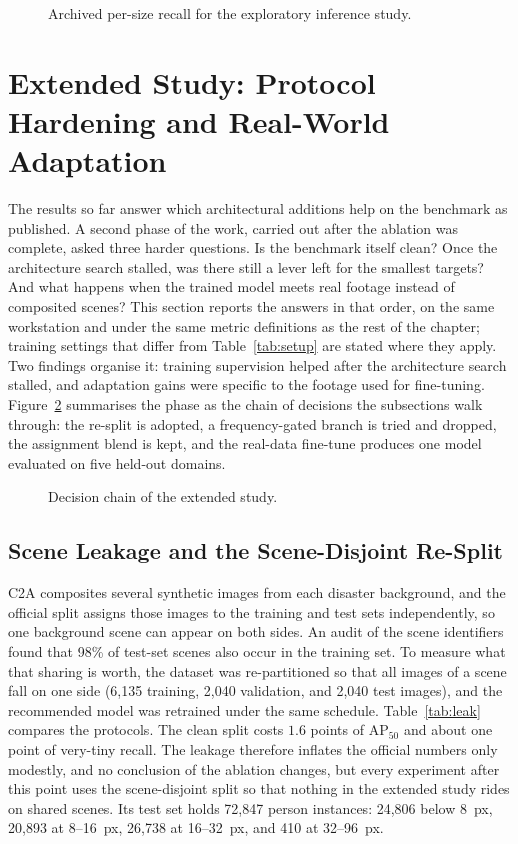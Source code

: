 \documentclass[12pt,a4paper,oneside]{report}
\begin{document}
\begin{figure}[tbp]
  \centering
  \caption{Archived per-size recall for the exploratory inference study.}
  \label{fig:sahibars}
\end{figure}

\section{Extended Study: Protocol Hardening and Real-World Adaptation}
\label{sec:partb}
The results so far answer which architectural additions help on the benchmark
as published. A second phase of the work, carried out after the ablation was
complete, asked three harder questions. Is the benchmark itself clean? Once the
architecture search stalled, was there still a lever left for the smallest
targets? And what happens when the trained model meets real footage instead of
composited scenes? This section reports the answers in that order, on the same
workstation and under the same metric definitions as the rest of the chapter;
training settings that differ from Table~\ref{tab:setup} are stated where they
apply. Two findings organise it: training supervision helped after the
architecture search stalled, and adaptation gains were specific to the footage
used for fine-tuning. Figure~\ref{fig:partbchain} summarises the phase as the chain
of decisions the subsections walk through: the re-split is adopted, a
frequency-gated branch is tried and dropped, the assignment blend is kept,
and the real-data fine-tune produces one model evaluated on five held-out
domains.

\begin{figure}[tbp]
  \centering
  \caption{Decision chain of the extended study.}
  \label{fig:partbchain}
\end{figure}

\subsection{Scene Leakage and the Scene-Disjoint Re-Split}
\label{sec:leak}
C2A composites several synthetic images from each disaster background, and the
official split assigns those images to the training and test sets
independently, so one background scene can appear on both sides. An audit of
the scene identifiers found that 98\% of test-set scenes also occur in the
training set. To measure what that sharing is worth, the dataset was
re-partitioned so that all images of a scene fall on one side (6{,}135
training, 2{,}040 validation, and 2{,}040 test images), and the recommended
model was retrained under the same schedule. Table~\ref{tab:leak} compares the
protocols. The clean split costs $1.6$ points of $\mathrm{AP}_{50}$ and about
one point of very-tiny recall. The leakage therefore inflates the official
numbers only modestly, and no conclusion of the ablation changes, but every
experiment after this point uses the scene-disjoint split so that nothing in
the extended study rides on shared scenes. Its test set holds 72{,}847 person
instances: 24{,}806 below 8~px, 20{,}893 at 8--16~px, 26{,}738 at 16--32~px,
and 410 at 32--96~px.
\end{document}
